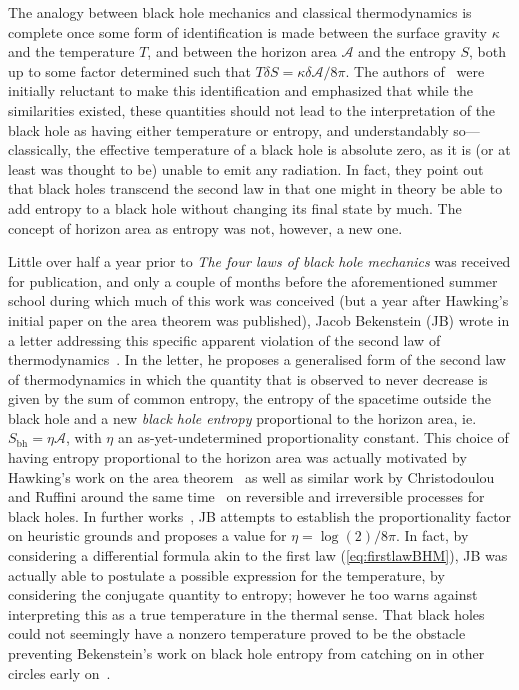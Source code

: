 \documentclass[
twoside,openright,frontopenright]{dmathesis}
\begin{document}
The analogy between black hole mechanics and classical thermodynamics is
complete once some form of identification is made between the surface gravity
$\kappa$ and the temperature $T$, and between the horizon area $\mathcal{A}$ and
the entropy $S$, both up to some factor determined such that
$T\delta S = \kappa \delta \mathcal{A} / 8\pi$. The authors
of~\cite{Bardeen:1973gs} were initially reluctant to make this identification
and emphasized that while the similarities existed, these quantities should not
lead to the interpretation of the black hole as having either temperature or
entropy, and understandably so---classically, the effective temperature of a
black hole is absolute zero, as it is (or at least was thought to be) unable to
emit any radiation. In fact, they point out that black holes transcend the
second law in that one might in theory be able to add entropy to a black hole
without changing its final state by much. The concept of horizon area as entropy
was not, however, a new one.

Little over half a year prior to \emph{The four laws of black hole mechanics}
was received for publication, and only a couple of months before the
aforementioned summer school during which much of this work was conceived (but a
year after Hawking's initial paper on the area theorem was published), Jacob
Bekenstein (JB) wrote in a letter addressing this specific apparent violation of the
second law of thermodynamics~\cite{Bekenstein:1972tm}. In the letter, he
proposes a generalised form of the second law of thermodynamics in which the
quantity that is observed to never decrease is given by the sum of common
entropy, the entropy of the spacetime outside the black hole and a new
\emph{black hole entropy} proportional to the horizon area, ie.
$S_{\mathrm{bh}}=\eta \mathcal{A}$, with $\eta$ an as-yet-undetermined
proportionality constant. This choice of having entropy proportional to the
horizon area was actually motivated by Hawking's work on the area
theorem~\cite{Hawking:1971tu} as well as similar work by Christodoulou and
Ruffini around the same time~\cite{Christodoulou:1970wf,Christodoulou:1972kt} on
reversible and irreversible processes for black holes. In further
works~\cite{Bekenstein:1973ur,Bekenstein:1974ax}, JB attempts to establish the
proportionality factor on heuristic grounds and proposes a value for
$\eta=\log(2)/8\pi$. In fact, by considering a differential formula akin to the
first law (\cref{eq:firstlawBHM}), JB was actually able to postulate a possible
expression for the temperature, by considering the conjugate quantity to
entropy; however he too warns against interpreting this as a true temperature in
the thermal sense. That black holes could not seemingly have a nonzero
temperature proved to be the obstacle preventing Bekenstein's work on black hole
entropy from catching on in other circles early on~\cite{10.2307/24953849}.
\end{document}
